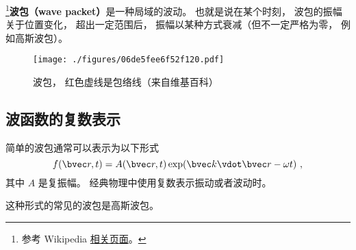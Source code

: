 

\footnote{参考 Wikipedia \href{https://en.wikipedia.org/wiki/Wave_packet}{相关页面}。}\textbf{波包（wave packet）}是一种局域的波动。 也就是说在某个时刻， 波包的振幅关于位置变化， 超出一定范围后， 振幅以某种方式衰减（但不一定严格为零， 例如高斯波包）。

\begin{figure}[ht]
\centering
\texttt{[image: ./figures/06de5fee6f52f120.pdf]}
\caption{波包， 红色虚线是包络线（来自维基百科）} \label{fig_WvPck_1}
\end{figure}

\subsection{波函数的复数表示}
简单的波包通常可以表示为以下形式
\begin{equation}
f(\bvec r, t) = A(\bvec r, t) \exp(\bvec k \vdot \bvec r - \omega t)~,
\end{equation}
其中 $A$ 是复振幅。 经典物理中使用复数表示振动或者波动时。

这种形式的常见的波包是高斯波包。
